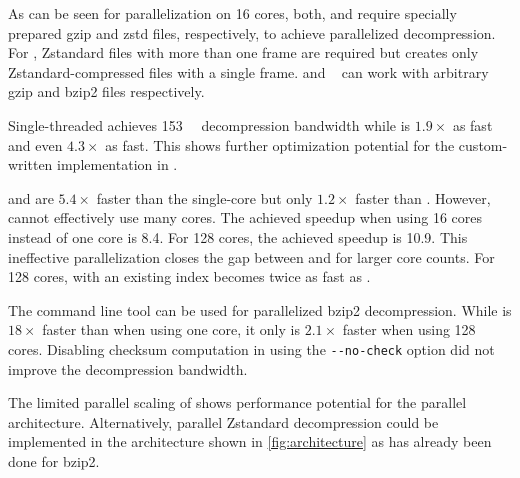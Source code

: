 As can be seen for parallelization on 16 cores, both, \bgzip and \pzstd require specially prepared gzip and zstd files, respectively, to achieve parallelized decompression.
For \pzstd, Zstandard files with more than one frame are required but  creates only Zstandard-compressed files with a single frame.
\Pragzip and ~\cite{lbzip2} can work with arbitrary gzip and bzip2 files respectively.

Single-threaded \pragzip achieves \qty{153}{\mega\byte} decompression bandwidth while \bgzip is $\num{1.9}\times$ as fast and  even $\num{4.3}\times$ as fast.
This shows further optimization potential for the custom-written  implementation in \pragzip.

 and  are $\num{5.4}\times$ faster than the single-core \pragzip but only $\num{1.2}\times$ faster than  .
However,  cannot effectively use many cores.
The achieved speedup when using \num{16} cores instead of one core is \num{8.4}.
For \num{128} cores, the achieved speedup is \num{10.9}.
This ineffective parallelization closes the gap between \pragzip and  for larger core counts.
For 128 cores, \pragzip with an existing index becomes twice as fast as .

The command line tool  can be used for parallelized bzip2 decompression.
While \pzstd is $\num{18}\times$ faster than  when using one core, it only is $\num{2.1}\times$ faster when using \num{128} cores.
Disabling checksum computation in \pzstd using the \texttt{-{}-no-check} option did not improve the decompression bandwidth.

The limited parallel scaling of \pzstd shows performance potential for the parallel architecture.
Alternatively, parallel Zstandard decompression could be implemented in the \pragzip architecture shown in \cref{fig:architecture} as has already been done for bzip2.
